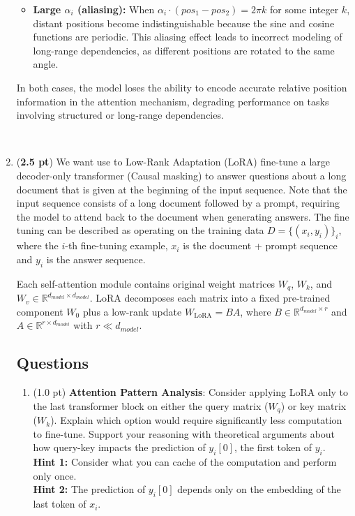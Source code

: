 \begin{enumerate}
\begin{answerbox}[3in]
\begin{itemize}
    \item \textbf{Large $\alpha_i$ (aliasing):} When $\alpha_i \cdot (pos_1 - pos_2) = 2\pi k$ for some integer $k$, distant positions become indistinguishable because the sine and cosine functions are periodic. This aliasing effect leads to incorrect modeling of long-range dependencies, as different positions are rotated to the same angle.

\end{itemize}

In both cases, the model loses the ability to encode accurate relative position information in the attention mechanism, degrading performance on tasks involving structured or long-range dependencies.
\end{answerbox}
~
\newpage

\item ({\bf 2.5 pt}) We want use to Low-Rank Adaptation (LoRA) fine-tune a large decoder-only transformer (Causal masking) to answer questions about a long document that is given at the beginning of the input sequence. Note that the input sequence consists of a long document followed by a prompt, requiring the model to attend back to the document when generating answers. The fine tuning can be described as operating on the training data $D = \{(x_i,y_i)\}_i$, where the $i$-th fine-tuning example, $x_i$ is the document + prompt sequence and $y_i$ is the answer sequence.

Each self-attention module contains original weight matrices $W_q$, $W_k$, and $W_v \in \mathbb{R}^{d_{model} \times d_{model}}$. LoRA decomposes each matrix into a fixed pre-trained component $W_0$ plus a low-rank update $W_{\text{LoRA}} = BA$, where $B \in \mathbb{R}^{d_{model} \times r}$ and $A \in \mathbb{R}^{r \times d_{model}}$ with $r \ll d_{model}$.

\subsection*{Questions}

\begin{enumerate}
    \item (1.0 pt) \textbf{Attention Pattern Analysis}:  
    Consider applying LoRA only to the last transformer block on either the query matrix ($W_q$) or key matrix ($W_k$). Explain which option would require significantly less computation to fine-tune. Support your reasoning with theoretical arguments about how query-key impacts the prediction of $y_i[0]$, the first token of $y_i$.\\
    {\bf Hint 1:} Consider what you can cache of the computation and perform only once.\\
    {\bf Hint 2:} The prediction of $y_i[0]$ depends only on the embedding of the last token of $x_i$.
~
\begin{answerbox}[2.5in]
    

\end{answerbox}
\end{enumerate}
\end{enumerate}
